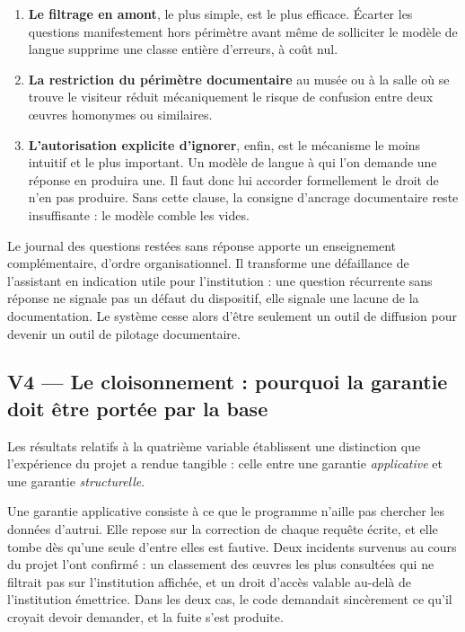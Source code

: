 \begin{enumerate}
  \item \textbf{Le filtrage en amont}, le plus simple, est le plus efficace.
        Écarter les questions manifestement hors périmètre avant même de
        solliciter le modèle de langue supprime une classe entière d'erreurs, à
        coût nul.

  \item \textbf{La restriction du périmètre documentaire} au musée ou à la salle
        où se trouve le visiteur réduit mécaniquement le risque de confusion
        entre deux œuvres homonymes ou similaires.

  \item \textbf{L'autorisation explicite d'ignorer}, enfin, est le mécanisme le
        moins intuitif et le plus important. Un modèle de langue à qui l'on
        demande une réponse en produira une. Il faut donc lui accorder
        formellement le droit de n'en pas produire. Sans cette clause, la
        consigne d'ancrage documentaire reste insuffisante : le modèle comble
        les vides.
\end{enumerate}

Le journal des questions restées sans réponse apporte un enseignement
complémentaire, d'ordre organisationnel. Il transforme une défaillance de
l'assistant en indication utile pour l'institution : une question récurrente
sans réponse ne signale pas un défaut du dispositif, elle signale une lacune de
la documentation. Le système cesse alors d'être seulement un outil de diffusion
pour devenir un outil de pilotage documentaire.

\subsection{V4 — Le cloisonnement : pourquoi la garantie doit être portée par la base}

Les résultats relatifs à la quatrième variable établissent une distinction que
l'expérience du projet a rendue tangible : celle entre une garantie
\emph{applicative} et une garantie \emph{structurelle}.

Une garantie applicative consiste à ce que le programme n'aille pas chercher les
données d'autrui. Elle repose sur la correction de chaque requête écrite, et
elle tombe dès qu'une seule d'entre elles est fautive. Deux incidents survenus
au cours du projet l'ont confirmé : un classement des œuvres les plus consultées
qui ne filtrait pas sur l'institution affichée, et un droit d'accès valable
au-delà de l'institution émettrice. Dans les deux cas, le code demandait
sincèrement ce qu'il croyait devoir demander, et la fuite s'est produite.

